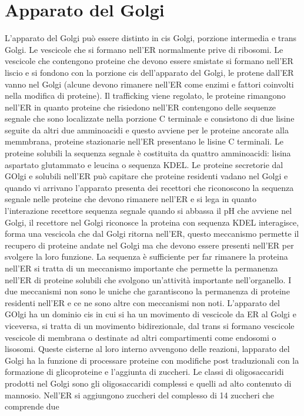 \section{Apparato del Golgi}
L'apparato del Golgi pu\`o essere distinto in cis Golgi, porzione intermedia e trans Golgi. Le vescicole che si formano nell'ER normalmente prive di ribosomi. Le vescicole che contengono
proteine che devono essere smistate si formano nell'ER liscio e si fondono con la porzione cis dell'apparato del Golgi, le protene dall'ER vanno nel Golgi (alcune devono rimanere nell'ER
come enzimi e fattori coinvolti nella modifica di proteine). Il trafficking viene regolato, le proteine rimangono nell'ER in quanto proteine che risiedono nell'ER contengono delle 
sequenze segnale che sono localizzate nella porzione C terminale e consistono di due lisine seguite da altri due amminoacidi e questo avviene per le proteine ancorate alla memmbrana, 
proteine stazionarie nell'ER presentano le lisine C terminali. Le proteine solubili la sequenza segnale \`e costituita da quattro amminoacidi: lisina aspartato glutammato e leucina o 
sequenza KDEL. Le proteine secretorie dal GOlgi e solubili nell'ER pu\`o capitare che proteine residenti vadano nel Golgi e quando vi arrivano l'apparato presenta dei recettori che
riconoscono la sequenza segnale nelle proteine che devono rimanere nell'ER e si lega in quanto l'interazione recettore sequenza segnale quando si abbassa il pH che avviene nel Golgi, 
il recettore nel Golgi riconosce la proteina con sequenza KDEL interagisce, forma una vescicola che dal Golgi ritorna nell'ER, questo meccanismo permette il recupero di proteine andate
nel Golgi ma che devono essere presenti nell'ER per svolgere la loro funzione. La sequenza \`e sufficiente per far rimanere la proteina nell'ER si tratta di un meccanismo importante che
permette la permanenza nell'ER di proteine solubili che svolgono un'attivit\`a importante nell'organello. I due meccanismi non sono le uniche che garantiscono la permanenza di proteine
residenti nell'ER e ce ne sono altre con meccanismi non noti. L'apparato del GOlgi ha un dominio cis in cui si ha un movimento di vescicole da ER al Golgi e viceversa, si tratta di un
movimento bidirezionale, dal trans si formano vescicole vescicole di membrana o destinate ad altri compartimenti come endosomi o lisosomi. Queste cisterne al loro interno avvengono 
delle reazioni, lapparato del Golgi ha la funzione di processare proteine con modifiche post traduzionali con la formazione di glicoproteine e l'aggiunta di zuccheri. Le classi di 
oligosaccaridi prodotti nel Golgi sono gli oligosaccaridi complessi e quelli ad alto contenuto di mannosio. Nell'ER si aggiungono zuccheri del complesso di 14 zuccheri che comprende due
